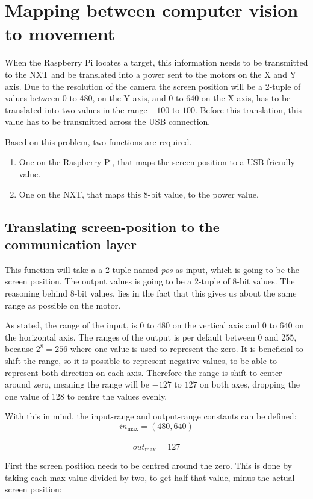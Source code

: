 \section{Mapping between computer vision to movement}
When the Raspberry Pi locates a target, this information needs to be transmitted to the NXT and be translated into a power sent to the motors on the X and Y axis.
Due to the resolution of the camera the screen position will be a 2-tuple of values between $0$ to $480$, on the Y axis, and $0$ to $640$ on the X axis, has to be translated into two values in the range $-100$ to $100$.
Before this translation, this value has to be transmitted across the USB connection.

Based on this problem, two functions are required. 
\begin{enumerate}
	\item One on the Raspberry Pi, that maps the screen position to a USB-friendly value.
	\item One on the NXT, that maps this 8-bit value, to the power value.
\end{enumerate}


\subsection{Translating screen-position to the communication layer}
This function will take a a 2-tuple named \textit{pos} as input, which is going to be the screen position.
The output values is going to be a 2-tuple of 8-bit values.
The reasoning behind 8-bit values, lies in the fact that this gives us about the same range as possible on the motor.

As stated, the range of the input, is $0$ to $480$ on the vertical axis and $0$ to $640$ on the horizontal axis.
The ranges of the output is per default between $0$ and $255$, because $2^8 = 256 $ where one value is used to represent the zero.
It is beneficial to shift the range, so it is possible to represent negative values, to be able to represent both direction on each axis.
Therefore the range is shift to center around zero, meaning the range will be $-127$ to $127$ on both axes, dropping the one value of 128 to centre the values evenly.

With this in mind, the input-range and output-range constants can be defined:\\
$$in_\text{max} = (480,640)$$\\
$$out_\text{max} = 127$$

First the screen position needs to be centred around the zero. This is done by taking each max-value divided by two, to get half that value, minus the actual screen position:

